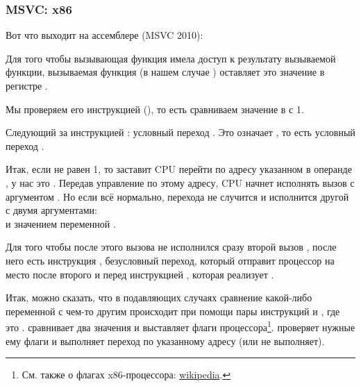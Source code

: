 \subsubsection{MSVC: x86}

Вот что выходит на ассемблере (MSVC 2010):



Для того чтобы вызывающая функция имела доступ к результату вызываемой функции, 
вызываемая функция (в нашем случае \scanf) оставляет это значение в регистре \EAX.

Мы проверяем его инструкцией  (), то есть сравниваем значение в \EAX с 1.

Следующий за инструкцией \CMP: условный переход \JNE. Это означает , то есть условный переход .

Итак, если \EAX не равен 1, то \JNE заставит \ac{CPU} перейти по адресу указанном в операнде \JNE, у нас это .
Передав управление по этому адресу, \ac{CPU} начнет исполнять вызов \printf с аргументом .
Но если всё нормально, перехода не случится и исполнится другой \printf с двумя аргументами:\\
 и значением переменной .

Для того чтобы после этого вызова не исполнился сразу второй вызов \printf, 
после него есть инструкция \JMP, безусловный переход, который отправит процессор на место 
после второго \printf и перед инструкцией , которая реализует .

Итак, можно сказать, что в подавляющих случаях сравнение какой-либо переменной с чем-то другим происходит при помощи пары инструкций \CMP и \Jcc, где  это .
\CMP сравнивает два значения и выставляет  флаги процессора\footnote{См. также о флагах x86-процессора: \href{http://go.yurichev.com/17120}{wikipedia}.}.
\Jcc проверяет нужные ему флаги и выполняет переход по указанному адресу (или не выполняет).

